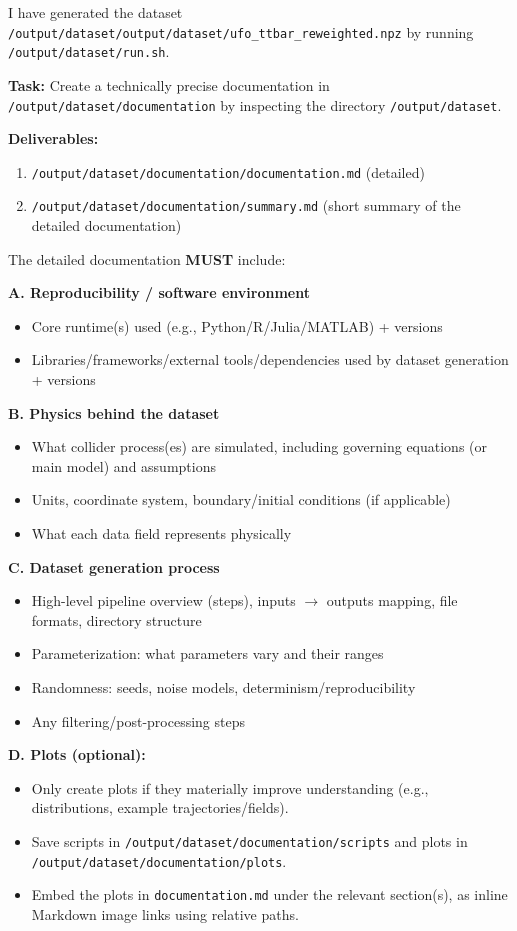 \documentclass[submission, Phys]{SciPost}
\begin{document}
\begin{userblock}[User]
I have generated the dataset \lstinline|/output/dataset/output/dataset/ufo_ttbar_reweighted.npz| by running \lstinline|/output/dataset/run.sh|.

\textbf{Task:} Create a technically precise documentation in \lstinline|/output/dataset/documentation| by inspecting the directory \lstinline|/output/dataset|.

\textbf{Deliverables:}
\begin{enumerate}
\item \lstinline|/output/dataset/documentation/documentation.md| (detailed)
\item \lstinline|/output/dataset/documentation/summary.md| (short summary of the detailed documentation)
\end{enumerate}

The detailed documentation \textbf{MUST} include:

\textbf{A. Reproducibility / software environment}
\begin{itemize}
\item Core runtime(s) used (e.g., Python/R/Julia/MATLAB) + versions
\item Libraries/frameworks/external tools/dependencies used by dataset generation + versions
\end{itemize}

\textbf{B. Physics behind the dataset}
\begin{itemize}
\item What collider process(es) are simulated, including governing equations (or main model) and assumptions
\item Units, coordinate system, boundary/initial conditions (if applicable)
\item What each data field represents physically
\end{itemize}

\textbf{C. Dataset generation process}
\begin{itemize}
\item High-level pipeline overview (steps), inputs $\to$ outputs mapping, file formats, directory structure
\item Parameterization: what parameters vary and their ranges
\item Randomness: seeds, noise models, determinism/reproducibility
\item Any filtering/post-processing steps
\end{itemize}

\textbf{D. Plots (optional):}
\begin{itemize}
\item Only create plots if they materially improve understanding (e.g., distributions, example trajectories/fields).
\item Save scripts in \lstinline|/output/dataset/documentation/scripts| and plots in \lstinline|/output/dataset/documentation/plots|.
\item Embed the plots in \lstinline|documentation.md| under the relevant section(s), as inline Markdown image links using relative paths.
\end{itemize}


\end{userblock}
\end{document}
